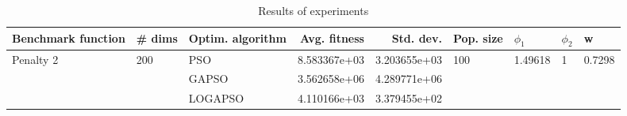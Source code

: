 \begin{table}
\centering
\caption{Results of experiments}
\begin{tabular}{lllrrllll}
\toprule
        Benchmark function &              \# dims & Optim. algorithm &  Avg. fitness &    Std. dev. &            Pop. size &               $\phi_{1}$ &         $\phi_{2}$ &                       w \\
\midrule
\multirow{3}{*}{Penalty 2} & \multirow{3}{*}{200} &              PSO &  8.583367e+03 & 3.203655e+03 & \multirow{3}{*}{100} & \multirow{3}{*}{1.49618} & \multirow{3}{*}{1} & \multirow{3}{*}{0.7298} \\
                           &                      &            GAPSO &  3.562658e+06 & 4.289771e+06 &                      &                          &                    &                         \\
                           &                      &          LOGAPSO &  4.110166e+03 & 3.379455e+02 &                      &                          &                    &                         \\
\bottomrule
\end{tabular}
\end{table}
